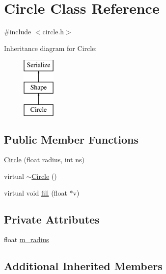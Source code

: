 \hypertarget{classCircle}{\section{Circle Class Reference}
\label{classCircle}
}


{\ttfamily \#include $<$circle.\-h$>$}

Inheritance diagram for Circle\-:\begin{figure}[H]
\begin{center}
\leavevmode
\includegraphics[height=3.000000cm]{classCircle}
\end{center}
\end{figure}
\subsection*{Public Member Functions}
\begin{DoxyCompactItemize}
\item 
\hyperlink{classCircle_a6dd3d6a0a6609e275dc16b7687244405}{Circle} (float radius, int ns)
\item 
virtual \hyperlink{classCircle_ae3f30436e645d73e368e8ee55f8d1650}{$\sim$\-Circle} ()
\item 
virtual void \hyperlink{classCircle_a59dab91c7a95f18e8b888a874c17826f}{fill} (float $\ast$v)
\end{DoxyCompactItemize}
\subsection*{Private Attributes}
\begin{DoxyCompactItemize}
\item 
float \hyperlink{classCircle_acbb9f46cef6c9deba7aa4e704bdc774f}{m\-\_\-radius}
\end{DoxyCompactItemize}
\subsection*{Additional Inherited Members}


